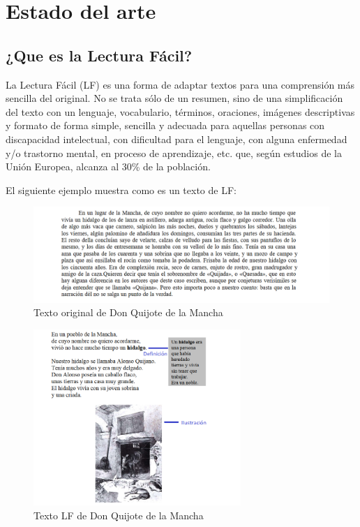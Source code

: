 \chapter{Estado del arte}
\label{cap:estadoDeLaCuestion}


\section{¿Que es la Lectura Fácil?}
La Lectura Fácil (LF) es una forma de adaptar textos para una comprensión más sencilla del original. No se trata sólo de un resumen, sino de una simplificación del texto con un lenguaje, vocabulario, términos, oraciones, imágenes descriptivas y formato de forma simple, sencilla y adecuada para aquellas personas con discapacidad intelectual, con dificultad para el lenguaje, con alguna enfermedad y/o trastorno mental, en proceso de aprendizaje, etc. que, según estudios de la Unión Europea, alcanza al 30\% de la población.

El siguiente ejemplo muestra como es un texto de LF:


\begin{figure}[htb]
	\centering
	\includegraphics[width=1.15\textwidth]{Imagenes/Ejemplos/Cap1DonQuijote}
	\caption{Texto original de Don Quijote de la Mancha}
	\label{fig:Quijote}
\end{figure} 


\begin{figure}[htb]
	\centering
	\includegraphics[width=0.7\textwidth]{Imagenes/Ejemplos/Cap1DonQuijoteLF}
	\caption{Texto LF de Don Quijote de la Mancha}
	\label{fig:QuijoteLF}
\end{figure}


